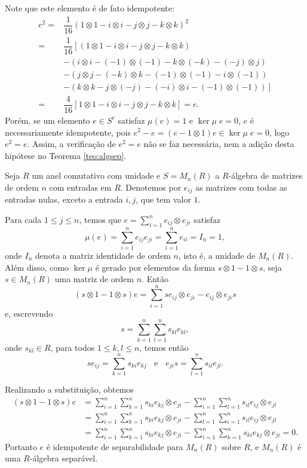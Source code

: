 \begin{exemplo}
Note que este elemento é de fato idempotente:
\begin{align*}
    e^2 =& \dfrac{1}{16}\left( 1\otimes1 - i \otimes i - j \otimes j - k \otimes k \right)^2 \\
    =& \dfrac{1}{16} \left[ \left( 1\otimes1 - i\otimes i - j\otimes j - k\otimes k \right) \right. \\
    &- \left(i\otimes i - (-1)\otimes(-1) - k\otimes (-k) - (-j)\otimes j  \right)\\
    &- \left(j\otimes j - (-k)\otimes k - (-1)\otimes(-1) - i\otimes (-1) \right)\\
    &- \left. \left( k\otimes k - j\otimes (-j) - (-i)\otimes i - (-1)\otimes (-1) \right) \right]\\
    =& \dfrac{4}{16}\left[1\otimes 1 - i \otimes i - j \otimes j - k \otimes k \right] = e.
\end{align*}
Porém, se um elemento $e \in S^e$ satisfaz $\mu(e) = 1$ e $\ker \mu \; e = 0$, $e$ é necessariamente idempotente, pois $e^2 - e = (e-1 \otimes 1)e \in \ker \mu \; e = 0$, logo $e^2 = e$. Assim, a verificação de $e^2 = e$ não se faz necessária, nem a adição desta hipótese no Teorema \ref{teo:algsep}.
\end{exemplo}
\begin{exemplo}
Seja $R$ um anel comutativo com unidade e $S = M_n(R)$ a $R$-álgebra de matrizes de ordem $n$ com entradas em $R$. Denotemos por $e_{ij}$ as matrizes com todas as entradas nulas, exceto a entrada ${i,j}$, que tem valor $1$.

Para cada $1\leq j \leq n$, temos que $e = \sum_{i=1}^n e_{ij} \otimes e_{ji}$ satisfaz
\[\mu(e) = \sum_{i = 1}^n e_{ij}e_{ji} = \sum_{i=1}^{n} e_{ii} = I_n = 1,\]
onde $I_n$ denota a matriz identidade de ordem $n$, isto é, a unidade de $M_n(R)$. Além disso, como $\ker \mu$ é gerado por elementos da forma $s\otimes 1 - 1 \otimes s$, seja $s \in M_n(R)$ uma matriz de ordem $n$. Então 
\[(s\otimes 1 - 1 \otimes s)e = \sum_{i = 1}^n s e_{ij} \otimes e_{ji} - e_{ij} \otimes e_{ji}s\]
e, escrevendo \[s = \sum_{k = 1}^{n} \sum_{l = 1}^n s_{kl}e_{kl},\] onde $s_{kl} \in R$, para todos $1\leq k, l \leq n$, temos então
\[se_{ij} = \sum_{k=1}^n s_{ki}e_{kj} \;\; \textrm{ e } \;\; e_{ji}s = \sum_{l = 1}^{n} s_{il} e_{jl}.\]

Realizando a substituição, obtemos
\begin{align*}
    (s\otimes 1 - 1 \otimes s) e &= \sum_{i=1}^n \sum_{k=1}^n s_{ki}e_{kj}\otimes e_{ji} - \sum_{i = 1}^n \sum_{l=1}^n s_{il} e_{ij} \otimes e_{jl} \\
    &= \sum_{i=1}^n \sum_{k=1}^n s_{ki}e_{kj}\otimes e_{ji} - \sum_{l = 1}^n \sum_{i=1}^n s_{il} e_{ij} \otimes e_{jl} \\
    &= \sum_{i=1}^n \sum_{k=1}^n s_{ki}e_{kj}\otimes e_{ji} - \sum_{i = 1}^n \sum_{k=1}^n s_{ki} e_{kj} \otimes e_{ji} = 0.
\end{align*}
Portanto $e$ é idempotente de separabilidade para $M_n(R)$ sobre $R$, e $M_n(R)$ é uma $R$-álgebra separável.
\end{exemplo}

